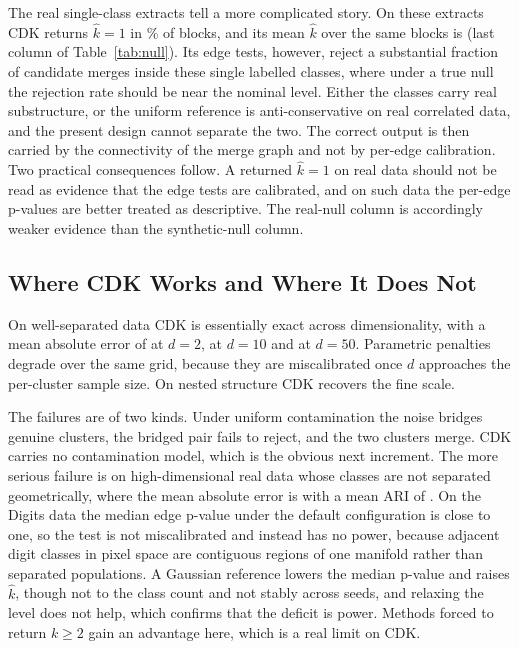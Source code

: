 \documentclass[runningheads]{llncs}
\begin{document}
The real single-class extracts tell a more complicated story. On these
\nNREALNULL{} extracts CDK returns $\hat k = 1$ in \nCDKRNULL\% of blocks, and
its mean $\hat k$ over the same blocks is \nCDKRNULLK{} (last column of
Table~\ref{tab:null}). Its edge tests, however, reject a substantial fraction
of candidate merges inside these single labelled classes, where under a true
null the rejection rate should be near the nominal level. Either the classes
carry real substructure, or the uniform reference is anti-conservative on real
correlated data, and the present design cannot separate the two. The correct
output is then carried by the connectivity of the merge graph and not by
per-edge calibration. Two practical consequences follow. A returned
$\hat k = 1$ on real data should not be read as evidence that the edge tests
are calibrated, and on such data the per-edge p-values are better treated as
descriptive. The real-null column is accordingly weaker evidence than the
synthetic-null column.

\subsection{Where CDK Works and Where It Does Not}

On well-separated data CDK is essentially exact across dimensionality, with a
mean absolute error of \nSEPDtwo{} at $d=2$, \nSEPDten{} at $d=10$ and
\nSEPDfifty{} at $d=50$. Parametric penalties degrade over the same grid,
because they are miscalibrated once $d$ approaches the per-cluster sample
size. On nested
structure CDK recovers the fine scale.

The failures are of two kinds. Under uniform contamination the noise bridges
genuine clusters, the bridged pair fails to reject, and the two clusters
merge. CDK carries no contamination model, which is the obvious next
increment. The more serious failure is on high-dimensional real data whose
classes are not separated geometrically, where the mean absolute error is
\nCDKREALMAE{} with a mean ARI of \nCDKREALARI{}. On the Digits data the
median edge p-value under the default configuration is close to one, so the
test is not miscalibrated and instead has no power, because adjacent digit
classes in pixel space are contiguous regions of one manifold rather than
separated populations. A Gaussian reference lowers the median p-value and
raises $\hat k$, though not to the class count and not stably across seeds,
and relaxing the level does not help, which confirms that the deficit is
power. Methods forced to return $k \ge 2$ gain an advantage here, which is a real
limit on CDK.
\end{document}
